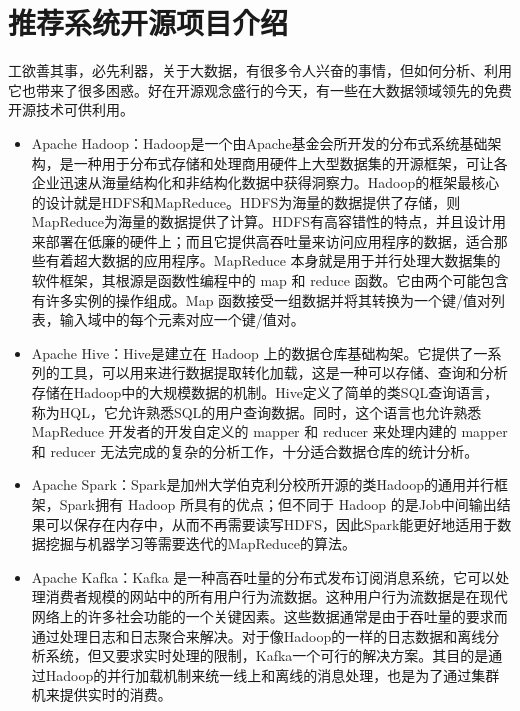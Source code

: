 \section{推荐系统开源项目介绍}
工欲善其事，必先利器，关于大数据，有很多令人兴奋的事情，但如何分析、利用它也带来了很多困惑。好在开源观念盛行的今天，有一些在大数据领域领先的免费开源技术可供利用。
\begin{itemize}
	\item Apache Hadoop：Hadoop是一个由Apache基金会所开发的分布式系统基础架构，是一种用于分布式存储和处理商用硬件上大型数据集的开源框架，可让各企业迅速从海量结构化和非结构化数据中获得洞察力。Hadoop的框架最核心的设计就是HDFS和MapReduce。HDFS为海量的数据提供了存储，则MapReduce为海量的数据提供了计算。HDFS有高容错性的特点，并且设计用来部署在低廉的硬件上；而且它提供高吞吐量来访问应用程序的数据，适合那些有着超大数据的应用程序。MapReduce 本身就是用于并行处理大数据集的软件框架，其根源是函数性编程中的 map 和 reduce 函数。它由两个可能包含有许多实例的操作组成。Map 函数接受一组数据并将其转换为一个键/值对列表，输入域中的每个元素对应一个键/值对。
	\item Apache Hive：Hive是建立在 Hadoop 上的数据仓库基础构架。它提供了一系列的工具，可以用来进行数据提取转化加载，这是一种可以存储、查询和分析存储在Hadoop中的大规模数据的机制。Hive定义了简单的类SQL查询语言，称为HQL，它允许熟悉SQL的用户查询数据。同时，这个语言也允许熟悉 MapReduce 开发者的开发自定义的 mapper 和 reducer 来处理内建的 mapper 和 reducer 无法完成的复杂的分析工作，十分适合数据仓库的统计分析。
	\item Apache Spark：Spark是加州大学伯克利分校所开源的类Hadoop的通用并行框架，Spark拥有 Hadoop 所具有的优点；但不同于 Hadoop 的是Job中间输出结果可以保存在内存中，从而不再需要读写HDFS，因此Spark能更好地适用于数据挖掘与机器学习等需要迭代的MapReduce的算法。
	\item Apache Kafka：Kafka 是一种高吞吐量的分布式发布订阅消息系统，它可以处理消费者规模的网站中的所有用户行为流数据。这种用户行为流数据是在现代网络上的许多社会功能的一个关键因素。这些数据通常是由于吞吐量的要求而通过处理日志和日志聚合来解决。对于像Hadoop的一样的日志数据和离线分析系统，但又要求实时处理的限制，Kafka一个可行的解决方案。其目的是通过Hadoop的并行加载机制来统一线上和离线的消息处理，也是为了通过集群机来提供实时的消费。
\end{itemize}

